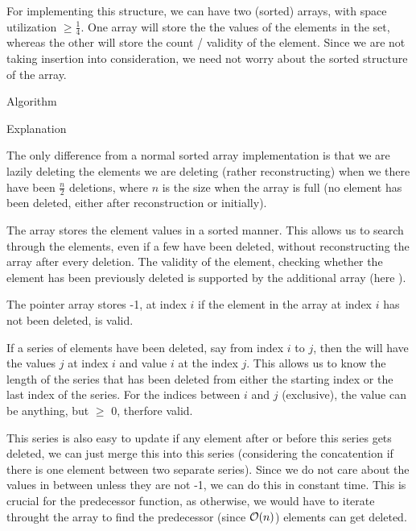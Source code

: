 \documentclass{article}
\begin{document}
\makeheader%

\begin{question}

	For implementing this structure, we can have two (sorted) arrays, with space utilization $\ge \frac{1}{4}$. One array will store the the values of the elements in the set, whereas the other will store the count / validity of the element. Since we are not taking insertion into consideration, we need not worry about the sorted structure of the array.

	\begin{qsection}{Algorithm}

		\begin{qsubsection}{Explanation}

			The only difference from a normal sorted array implementation is that we are lazily deleting the elements  we are deleting (rather reconstructing) when we there have been $\frac{n}{2}$ deletions, where $n$ is the size when the array is full (no element has been deleted, either after reconstruction or initially). \br%

			The  array stores the element values in a sorted manner. This allows us to search through the elements, even if a few have been deleted, without reconstructing the array after every deletion. The validity of the element,  checking whether the element has been previously deleted is supported by the additional array (here ). \br%

			The pointer array stores -1, at index $i$ if the element in the  array at index $i$ has not been deleted,  is valid. \br%

			If a series of elements have been deleted, say from index $i$ to $j$, then the  will have the values $j$ at index $i$ and value $i$ at the index $j$. This allows us to know the length of the series that has been deleted from either the starting index or the last index of the series. For the indices between $i$ and $j$ (exclusive), the value can be anything, but $\ge$ 0, therfore valid. \br%

			This series is also easy to update if any element after or before this series gets deleted, we can just merge this into this series (considering the concatention if there is one element between two separate series). Since we do not care about the values in between unless they are not -1, we can do this in constant time. This is crucial for the predecessor function, as otherwise, we would have to iterate throught the array to find the predecessor (since $\mathcal{O}(n)$) elements can get deleted.


\end{qsubsection}
\end{qsection}
\end{question}
\end{document}
